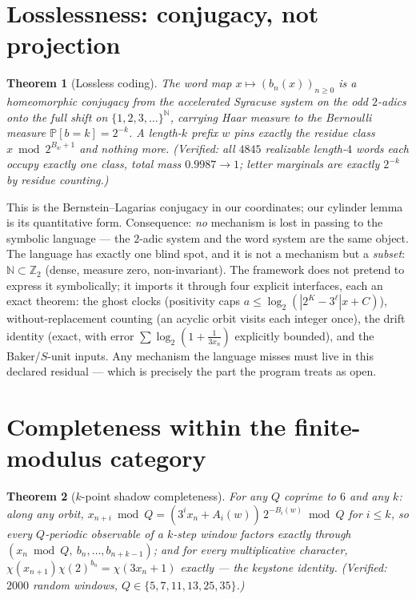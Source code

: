 \documentclass[11pt]{article}
\newtheorem{theorem}{Theorem}
\newcommand{\Ztwo}{\mathbb Z_2}
\begin{document}
\section{Losslessness: conjugacy, not projection}

\begin{theorem}[Lossless coding]\label{thm:conj}
The word map $x\mapsto(b_n(x))_{n\ge0}$ is a homeomorphic conjugacy
from the accelerated Syracuse system on the odd $2$-adics onto the
full shift on $\{1,2,3,\dots\}^{\mathbb N}$, carrying Haar measure to
the Bernoulli measure $\mathbb P[b=k]=2^{-k}$. A length-$k$ prefix
$w$ pins exactly the residue class $x\bmod2^{B_w+1}$ and nothing
more. (Verified: all $4845$ realizable length-$4$ words each occupy
exactly one class, total mass $0.9987\to1$; letter marginals are
exactly $2^{-k}$ by residue counting.)
\end{theorem}

This is the Bernstein--Lagarias conjugacy in our coordinates; our
cylinder lemma is its quantitative form. Consequence: \emph{no}
mechanism is lost in passing to the symbolic language --- the
$2$-adic system and the word system are the same object. The language
has exactly one blind spot, and it is not a mechanism but a
\emph{subset}: $\mathbb N\subset\Ztwo$ (dense, measure zero,
non-invariant). The framework does not pretend to express it
symbolically; it imports it through four explicit interfaces, each an
exact theorem: the ghost clocks (positivity caps
$a\le\log_2(|2^K-3^\ell|x+C)$), without-replacement counting (an
acyclic orbit visits each integer once), the drift identity (exact,
with error $\sum\log_2(1+\tfrac1{3x_n})$ explicitly bounded), and the
Baker/$S$-unit inputs. Any mechanism the language misses must live in
this declared residual --- which is precisely the part the program
treats as open.

\section{Completeness within the finite-modulus category}

\begin{theorem}[$k$-point shadow completeness]\label{thm:complete}
For any $Q$ coprime to $6$ and any $k$: along any orbit,
$x_{n+i}\bmod Q=(3^ix_n+A_i(w))\,2^{-B_i(w)}\bmod Q$ for
$i\le k$, so \emph{every} $Q$-periodic observable of a $k$-step
window factors exactly through $(x_n\bmod Q,\ b_n,\dots,b_{n+k-1})$;
and for every multiplicative character,
$\chi(x_{n+1})\chi(2)^{b_n}=\chi(3x_n+1)$ exactly --- the keystone
identity. (Verified: $2000$ random windows, $Q\in\{5,7,11,13,25,35\}$.)
\end{theorem}
\end{document}
